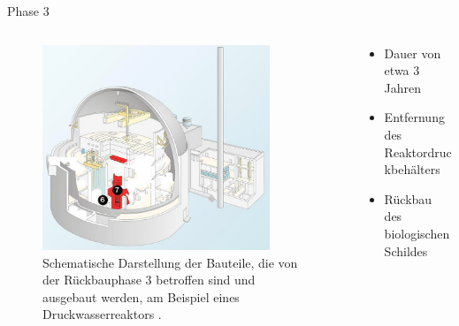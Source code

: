 \begin{frame}{Phase 3}
  \begin{columns}

    \begin{column}{0.48\textwidth}
      \begin{figure}
         \centering
         \includegraphics[width=0.85\textwidth]{./bilder/abbau_phase_3_spiegel.png}
         \caption{Schematische Darstellung der Bauteile, die von der Rückbauphase 3 betroffen sind und ausgebaut werden, am Beispiel eines Druckwasserreaktors \cite{abbau_grafik_stade}. }
         \label{ fig: phase_3 }
       \end{figure}
     \end{column}

     \begin{column}{0.48\textwidth}
       \begin{itemize}
         \setlength\itemsep{1.2em}
         \item{ Dauer von etwa 3 Jahren}
         \item{ Entfernung des Reaktordruckbehälters }
         \item{ Rückbau des biologischen Schildes }
       \end{itemize}
     \end{column}

  \end{columns}
\end{frame}



